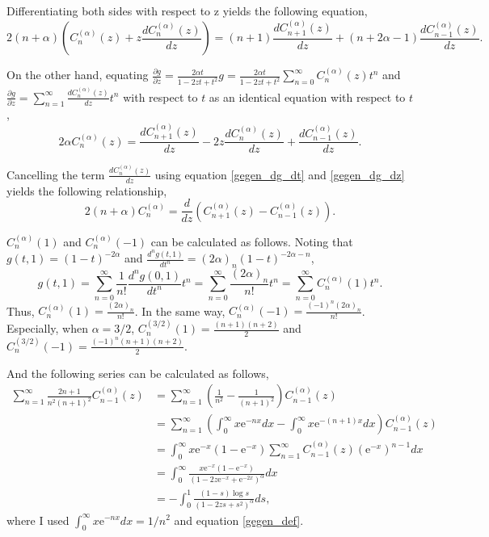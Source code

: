 \documentclass[12pt]{article}
\newcommand{\napier}{\mathrm{e}}
\newcommand{\bibun}[2]{\frac{d {#1}}{d {#2}}}
\newcommand{\henbibun}[2]{\frac{\partial {#1}}{\partial {#2}}}
\begin{document}
Differentiating both sides with respect to z yields the following equation,
\begin{equation}
 2(n+\alpha) \left( C^{(\alpha)}_{n} (z) +  z \bibun{C^{(\alpha)}_{n} (z)}{z} \right) = (n+1) \bibun{C^{(\alpha)}_{n+1}(z)}{z} + (n+2\alpha - 1) \bibun{C^{(\alpha)}_{n-1}(z)}{z}.\label{gegen_dg_dt}
\end{equation}

On the other hand, equating $\henbibun{g}{z} = \frac{2\alpha t}{1-2zt+t^2} g = \frac{2\alpha t}{1-2zt+t^2} \sum_{n=0}^{\infty} C^{(\alpha)}_{n} (z) t^n$ and
$\henbibun{g}{z} = \sum_{n=1}^{\infty} \bibun{C^{(\alpha)}_{n} (z)}{z} t^{n}$ with respect to $t$ as an identical equation with respect to $t$,
\begin{equation}
 2\alpha C^{(\alpha)}_{n} (z) = \bibun{C^{(\alpha)}_{n+1} (z)}{z} - 2z \bibun{C^{(\alpha)}_{n} (z)}{z} + \bibun{C^{(\alpha)}_{n-1} (z)}{z}.\label{gegen_dg_dz}
\end{equation}

Cancelling the term $\bibun{C^{(\alpha)}_{n} (z)}{z}$ using equation \eqref{gegen_dg_dt} and \eqref{gegen_dg_dz} yields the following relationship,
\begin{equation}
 2(n+\alpha) C^{(\alpha)}_{n} = \bibun{}{z} \left( C^{(\alpha)}_{n+1} (z) - C^{(\alpha)}_{n-1} (z) \right).\label{gegen_diff}
\end{equation}

$C^{(\alpha)}_n (1)$ and $C^{(\alpha)}_n (-1)$ can be calculated as follows.
Noting that $g(t,1) = (1-t)^{-2\alpha}$ and $\frac{d^n g(t,1)}{dt^n} = (2\alpha)_n (1-t)^{-2\alpha - n}$,
\begin{equation}
 g(t,1) = \sum_{n=0}^{\infty} \frac{1}{n!} \frac{d^n g(0,1)}{dt^n} t^n = \sum_{n=0}^{\infty} \frac{(2\alpha)_n}{n!} t^n = \sum_{n=0}^{\infty} C^{(\alpha)}_n (1) t^n.
\end{equation}
Thus, $C^{(\alpha)}_n (1) = \frac{(2\alpha)_n}{n!}$. In the same way, $C^{(\alpha)}_n (-1) = \frac{(-1)^{n} (2\alpha)_n}{n!}$.
Especially, when $\alpha=3/2$,
$C^{(3/2)}_n (1) = \frac{(n+1)(n+2)}{2}$ and $C^{(3/2)}_n (-1) = \frac{(-1)^n (n+1)(n+2)}{2}$.

And the following series can be calculated as follows,
\begin{align}
 \sum_{n=1}^{\infty}\frac{2n+1}{n^2(n+1)^2} C^{(\alpha)}_{n-1} (z) & = \sum_{n=1}^{\infty} \left( \frac{1}{n^2} - \frac{1}{(n+1)^2} \right) C^{(\alpha)}_{n-1} (z)\\
 & = \sum_{n=1}^{\infty} \left( \int_{0}^{\infty} x \napier^{-nx} dx - \int_{0}^{\infty} x \napier^{-(n+1)x} dx \right) C^{(\alpha)}_{n-1} (z)\\
 & = \int_{0}^{\infty} x \napier^{-x} \left( 1 - \napier^{-x} \right) \sum_{n=1}^{\infty} C^{(\alpha)}_{n-1} (z) \left( \napier^{-x} \right)^{n-1} dx\\
 & = \int_{0}^{\infty} \frac{x \napier^{-x} \left( 1 - \napier^{-x} \right)}{ \left(1 -2z\napier^{-x} + \napier^{-2x}\right)^{\alpha}} dx\\
 & = - \int_{0}^{1} \frac{(1 - s) \log s}{ \left(1 -2zs + s^2 \right)^{\alpha}} ds,\label{gegen_int}
\end{align}
where I used $\int_{0}^{\infty} x \napier^{-nx} dx = 1/n^2$ and equation \eqref{gegen_def}.
\end{document}
